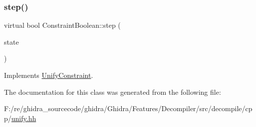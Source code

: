 \subsubsection{\texorpdfstring{step()}{step()}}
{\footnotesize\ttfamily virtual bool Constraint\+Boolean\+::step (\begin{DoxyParamCaption}\item[{\mbox{\hyperlink{class_unify_state}{Unify\+State}} \&}]{state }\end{DoxyParamCaption})\hspace{0.3cm}{\ttfamily [virtual]}}



Implements \mbox{\hyperlink{class_unify_constraint_ad9ab4ad91037f96bf803735d414d212d}{Unify\+Constraint}}.



The documentation for this class was generated from the following file\+:\begin{DoxyCompactItemize}
\item 
F\+:/re/ghidra\+\_\+sourcecode/ghidra/\+Ghidra/\+Features/\+Decompiler/src/decompile/cpp/\mbox{\hyperlink{unify_8hh}{unify.\+hh}}\end{DoxyCompactItemize}
